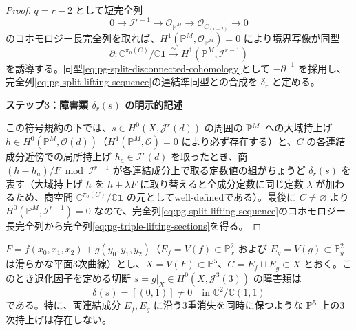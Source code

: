 \begin{proof}
$q=r-2$ として短完全列
\begin{equation}
 0\longrightarrow\mathcal I^{r-1}\longrightarrow\mathcal O_{\mathbb P^M}
 \longrightarrow\mathcal O_{C_{(r-2)}}\longrightarrow0
\end{equation}
のコホモロジー長完全列を取れば、$H^1(\mathbb P^M,\mathcal O_{\mathbb P^M})=0$ により境界写像が同型
\begin{equation}
 \partial:\mathbb C^{\pi_0(C)}/\mathbb C\mathbf1
 \xrightarrow{\sim}H^1(\mathbb P^M,\mathcal I^{r-1})
\end{equation}
を誘導する。同型\eqref{eq:pg-split-disconnected-cohomology}として $-\partial^{-1}$ を採用し、完全列\eqref{eq:pg-split-lifting-sequence}の連結準同型との合成を $\delta_r$ と定める。

\par\medskip\noindent\textbf{ステップ3：障害類 $\delta_r(s)$ の明示的記述}\par\nobreak\smallskip
この符号規約の下では、$s\in H^0(X,\mathcal J^r(d))$ の周囲の $\mathbb P^M$ への大域持上げ $h\in H^0(\mathbb P^M,\mathcal O(d))$（$H^1(\mathbb P^M,\mathcal O)=0$ により必ず存在する）と、$C$ の各連結成分近傍での局所持上げ $h_a\in\mathcal I^r(d)$ を取ったとき、商 $(h-h_a)/F\bmod\mathcal I^{r-1}$ が各連結成分上で取る定数値の組がちょうど $\delta_r(s)$ を表す（大域持上げ $h$ を $h+\lambda F$ に取り替えると全成分定数に同じ定数 $\lambda$ が加わるため、商空間 $\mathbb C^{\pi_0(C)}/\mathbb C\mathbf1$ の元としてwell-definedである）。最後に $C\ne\varnothing$ より $H^0(\mathbb P^M,\mathcal I^{r-1})=0$ なので、完全列\eqref{eq:pg-split-lifting-sequence}のコホモロジー長完全列から完全列\eqref{eq:pg-triple-lifting-sections}を得る。
\end{proof}

\begin{corollary}
\label{cor:pg-split-lifting-obstruction}
$F=f(x_0,x_1,x_2)+g(y_0,y_1,y_2)$（$E_f=V(f)\subset\mathbb P^2_x$ および $E_g=V(g)\subset\mathbb P^2_y$ は滑らかな平面3次曲線）とし、$X=V(F)\subset\mathbb P^5$、$C=E_f\sqcup E_g\subset X$ とおく。このとき退化因子を定める切断 $s=g|_X\in H^0(X,\mathcal J^3(3))$ の障害類は
\begin{equation}
\label{eq:pg-split-obstruction-class}\delta(s)=[(0,1)]\ne0\quad\text{in }\mathbb C^2/\mathbb C(1,1)
\end{equation}
である。特に、両連結成分 $E_f,E_g$ に沿う3重消失を同時に保つような $\mathbb P^5$ 上の3次持上げは存在しない。
\end{corollary}


